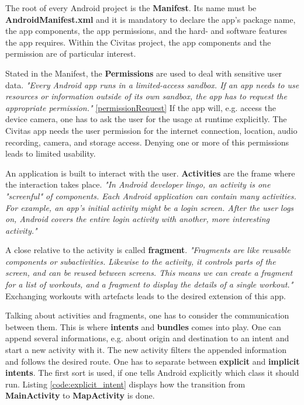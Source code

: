 The root of every Android project is the \textbf{Manifest}. Its name must be \textbf{AndroidManifest.xml} and it is mandatory to declare the app's package name, the app components, the app permissions, and the hard- and software features the app requires. Within the Civitas project, the app components and the permission are of particular interest.

Stated in the Manifest, the \textbf{Permissions} are used to deal with sensitive user data. \textit{"Every Android app runs in a limited-access sandbox. If an app needs to use resources or information outside of its own sandbox, the app has to request the appropriate permission."} \ref{permissionRequest} If the app will, e.g. access the device camera, one has to ask the user for the usage at runtime explicitly. 
The Civitas app needs the user permission for the internet connection, location, audio recording, camera, and storage access.
Denying one or more of this permissions leads to limited usability. 

An application is built to interact with the user. \textbf{Activities} are the frame where the interaction takes place. \textit{"In Android developer lingo, an \textit{activity} is one "screenful" of components. Each Android application can contain many activities. For example, an app's initial activity might be a login screen. After the user logs on, Android covers the entire login activity with another, more interesting activity."} \citep[p. 98]{Burd:2017}

A close relative to the activity is called \textbf{fragment}. \textit{"Fragments are like reusable components or subactivities. Likewise to the activity, it controls parts of the screen, and can be reused between screens. This means we can create a fragment for a list of workouts, and a fragment to display the details of a single workout."} \citep[p. 342]{Griffiths:2017}
Exchanging workouts with artefacts leads to the desired extension of this app.

Talking about activities and fragments, one has to consider the communication between them. This is where \textbf{intents} and \textbf{bundles} comes into play. One can append several informations, e.g. about origin and destination to an intent and start a new activity with it. The new activity filters the appended information and follows the desired route. One has to separate between \textbf{explicit} and \textbf{implicit intents}. 
The first sort is used, if one tells Android explicitly which class it should run. Listing \ref{code:explicit_intent} displays how the transition from \textbf{MainActivity} to \textbf{MapActivity} is done.

